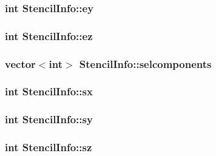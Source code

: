 \subsubsection[{ey}]{\setlength{\rightskip}{0pt plus 5cm}int Stencil\+Info\+::ey}\label{struct_stencil_info_a584955f3761b5854a9050c97cba3c3ca}
\hypertarget{struct_stencil_info_afbdda2df54c6af8e9e8b8536e6e31bdc}{}
\subsubsection[{ez}]{\setlength{\rightskip}{0pt plus 5cm}int Stencil\+Info\+::ez}\label{struct_stencil_info_afbdda2df54c6af8e9e8b8536e6e31bdc}
\hypertarget{struct_stencil_info_a6a07ebcb676dabaadf000e1348b8c016}{}
\subsubsection[{selcomponents}]{\setlength{\rightskip}{0pt plus 5cm}vector$<$int$>$ Stencil\+Info\+::selcomponents}\label{struct_stencil_info_a6a07ebcb676dabaadf000e1348b8c016}
\hypertarget{struct_stencil_info_acbfb2d23b2b10177dd846173a299b847}{}
\subsubsection[{sx}]{\setlength{\rightskip}{0pt plus 5cm}int Stencil\+Info\+::sx}\label{struct_stencil_info_acbfb2d23b2b10177dd846173a299b847}
\hypertarget{struct_stencil_info_a4f024cdf41fca32720321fa95bd2a8bd}{}
\subsubsection[{sy}]{\setlength{\rightskip}{0pt plus 5cm}int Stencil\+Info\+::sy}\label{struct_stencil_info_a4f024cdf41fca32720321fa95bd2a8bd}
\hypertarget{struct_stencil_info_a00e8cbf611bbb74ad861a6d74b6d0d9f}{}
\subsubsection[{sz}]{\setlength{\rightskip}{0pt plus 5cm}int Stencil\+Info\+::sz}\label{struct_stencil_info_a00e8cbf611bbb74ad861a6d74b6d0d9f}
\hypertarget{struct_stencil_info_ab3fce74853afec119eee90a6274d1559}{}
